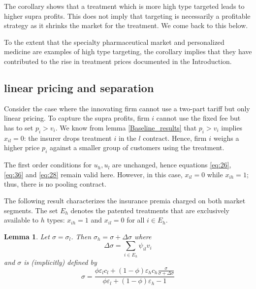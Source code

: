 \documentclass[12pt,english,a4paper]{article}
\newtheorem{lemma}{Lemma}
\begin{document}
The corollary shows that a treatment which is more high type targeted leads to higher supra profits. This does not imply that targeting is necessarily a profitable strategy as it shrinks the market for the treatment. We come back to this below.

To the extent that the specialty pharmaceutical market and  personalized medicine are examples of high type targeting, the corollary implies that they have contributed to the rise in treatment prices documented in the Introduction.

\subsection{linear pricing and separation}
\label{sec:orga134402}

Consider the case where the innovating firm cannot use a two-part tariff but only linear pricing. To capture the supra profits, firm \(i\) cannot use the fixed fee but has to set \(p_i > v_i\). We know from lemma \ref{Baseline_results} that \(p_i>v_i\) implies \(x_{il}=0\): the insurer drops treatment \(i\) in the \(l\) contract. Hence, firm \(i\) weighs a higher price \(p_i\) against a smaller group of customers using the treatment.

The first order conditions for \(u_h,u_l\) are unchanged, hence equations \eqref{eq:26}, \eqref{eq:36} and \eqref{eq:28} remain valid here. However, in this case, \(x_{il}=0\) while \(x_{ih}=1\); thus, there is no pooling contract.

The following result characterizes the insurance premia charged on both market segments. The set \(E_h\) denotes the patented treatments that are exclusively available to \(h\) types: \(x_{ih}=1\) and \(x_{il}=0\) for all \(i \in E_h\).

\begin{lemma}
\label{Linear_pricing_premium}
Let \(\sigma=\sigma_l\). Then \(\sigma_h=\sigma+\Delta \sigma\) where
\begin{equation}
\label{eq:52}
\Delta \sigma = \sum_{i \in E_h} \psi_{il} v_i
\end{equation}
and \(\sigma\) is (implicitly) defined by
\begin{equation}
\label{eq:37}
\sigma = \frac{\phi \varepsilon_l c_l +(1-\phi) \varepsilon_h c_h \frac{\sigma}{\sigma + \Delta \sigma} }{\phi \varepsilon_l +(1-\phi) \varepsilon_h-1}
\end{equation}
\end{lemma}
\end{document}

